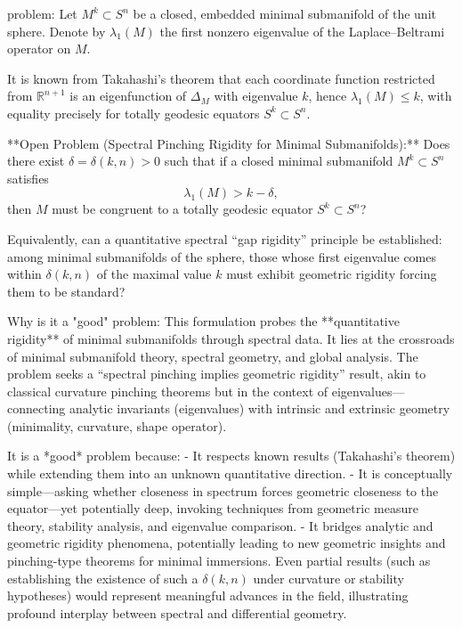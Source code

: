 problem:  
Let \(M^k \subset S^n\) be a closed, embedded minimal submanifold of the unit sphere. Denote by \(\lambda_1(M)\) the first nonzero eigenvalue of the Laplace–Beltrami operator on \(M\).  

It is known from Takahashi’s theorem that each coordinate function restricted from \(\mathbb{R}^{n+1}\) is an eigenfunction of \(\Delta_M\) with eigenvalue \(k\), hence \(\lambda_1(M)\le k\), with equality precisely for totally geodesic equators \(S^k \subset S^n\).  

**Open Problem (Spectral Pinching Rigidity for Minimal Submanifolds):**  
Does there exist \(\delta = \delta(k,n) > 0\) such that if a closed minimal submanifold \(M^k \subset S^n\) satisfies 
\[
\lambda_1(M) > k - \delta,
\]
then \(M\) must be congruent to a totally geodesic equator \(S^k \subset S^n\)?  

Equivalently, can a quantitative spectral “gap rigidity” principle be established: among minimal submanifolds of the sphere, those whose first eigenvalue comes within \(\delta(k,n)\) of the maximal value \(k\) must exhibit geometric rigidity forcing them to be standard?  

Why is it a "good" problem:  
This formulation probes the **quantitative rigidity** of minimal submanifolds through spectral data. It lies at the crossroads of minimal submanifold theory, spectral geometry, and global analysis. The problem seeks a “spectral pinching implies geometric rigidity” result, akin to classical curvature pinching theorems but in the context of eigenvalues—connecting analytic invariants (eigenvalues) with intrinsic and extrinsic geometry (minimality, curvature, shape operator).  

It is a *good* problem because:  
- It respects known results (Takahashi’s theorem) while extending them into an unknown quantitative direction.  
- It is conceptually simple—asking whether closeness in spectrum forces geometric closeness to the equator—yet potentially deep, invoking techniques from geometric measure theory, stability analysis, and eigenvalue comparison.  
- It bridges analytic and geometric rigidity phenomena, potentially leading to new geometric insights and pinching-type theorems for minimal immersions.  
Even partial results (such as establishing the existence of such a \(\delta(k,n)\) under curvature or stability hypotheses) would represent meaningful advances in the field, illustrating profound interplay between spectral and differential geometry.